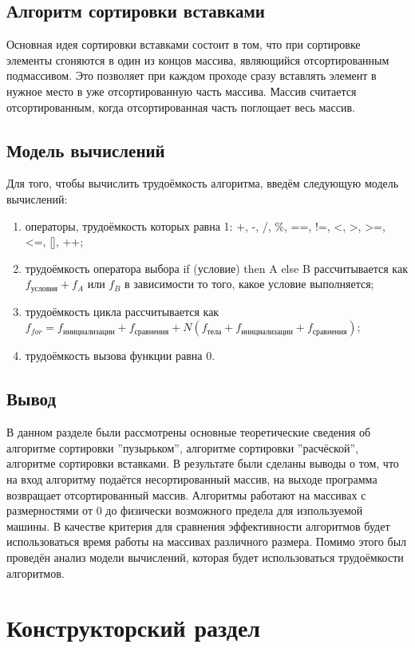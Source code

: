 \section{Алгоритм сортировки вставками}
Основная идея сортировки вставками состоит в том, что при сортировке элементы сгоняются в один из концов массива, являющийся отсортированным подмассивом. Это позволяет при каждом проходе сразу вставлять элемент в нужное место в уже отсортированную часть массива. Массив считается отсортированным, когда отсортированная часть поглощает весь массив.

\section{Модель вычислений}
Для того, чтобы вычислить трудоёмкость алгоритма, введём следующую модель вычислений:

\begin{enumerate}
	\item операторы, трудоёмкость которых равна 1: +, -, /, \%, ==, !=, <, >, >=, <=, [], ++;
	\item трудоёмкость оператора выбора if (условие) then A else B рассчитывается как $f_{\text{условия}} + f_{A}$ или $f_{B}$ в зависимости то того, какое условие выполняется;
	\item трудоёмкость цикла рассчитывается как $f_{for} = f_{\text{инициализации}} + f_{\text{сравнения}} + N(f_{\text{тела}} + f_{\text{инициализации}} + f_{\text{сравнения}})$;
	\item трудоёмкость вызова функции равна 0.
\end{enumerate}

\section{Вывод}
В данном разделе были рассмотрены основные теоретические сведения об алгоритме сортировки ''пузырьком'', алгоритме сортировки ''расчёской'', алгоритме сортировки вставками. В результате были сделаны выводы о том, что на вход алгоритму подаётся несортированный массив, на выходе программа возвращает отсортированный массив. Алгоритмы работают на массивах с размерностями от 0 до физически возможного предела для изпользуемой машины. В качестве критерия для сравнения эффективности алгоритмов будет использоваться время работы на массивах различного размера. Помимо этого был проведён анализ модели вычислений, которая будет использоваться трудоёмкости алгоритмов.

\chapter{Конструкторский раздел}


